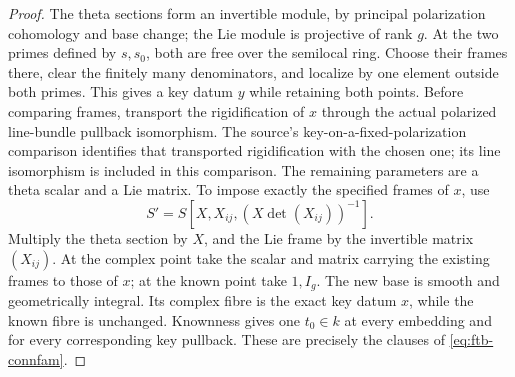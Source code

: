 \begin{proof}
The theta sections form an invertible module, by principal
polarization cohomology and base change; the Lie module is
projective of rank \(g\).
At the two primes defined by \(s,s_0\), both are free over
the semilocal ring.
Choose their frames there, clear the finitely many
denominators, and localize by one element outside both
primes.  This gives a key datum \(y\) while retaining both
points.
Before comparing frames, transport the rigidification of \(x\)
through the actual polarized line-bundle pullback isomorphism.
The source's key-on-a-fixed-polarization comparison identifies
that transported rigidification with the chosen one; its line
isomorphism is included in this comparison.  The remaining
parameters are a theta scalar and a Lie matrix.
To impose exactly the specified frames of \(x\), use
\[
                  S'=S[X,X_{ij},(X\det(X_{ij}))^{-1}].
 \tag{F8}\label{eq:ftb-universal-key-frame-torsor}
\]
Multiply the theta section by \(X\), and the Lie frame by
the invertible matrix \((X_{ij})\).
At the complex point take the scalar and matrix carrying
the existing frames to those of \(x\); at the known point
take \(1,I_g\).
The new base is smooth and geometrically integral.
Its complex fibre is the exact key datum \(x\), while the
known fibre is unchanged.
Knownness gives one \(t_0\in k\) at every embedding and for
every corresponding key pullback.
These are precisely the clauses of \eqref{eq:ftb-connfam}.
\end{proof}

